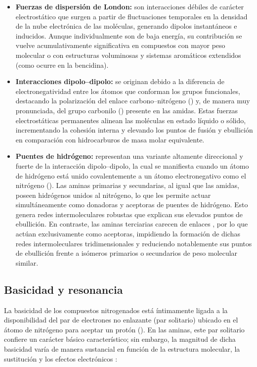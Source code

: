 \begin{itemize}
	\item \textbf{Fuerzas de dispersión de London:} son interacciones débiles de
	carácter electrostático que surgen a partir de fluctuaciones temporales en la
	densidad de la nube electrónica de las moléculas, generando dipolos
	instantáneos e inducidos. Aunque individualmente son de baja energía, su
	contribución se vuelve acumulativamente significativa en compuestos con mayor
	peso molecular o con estructuras voluminosas y sistemas aromáticos extendidos
	(como ocurre en la bencidina).
	\item \textbf{Interacciones dipolo--dipolo:} se originan debido a la diferencia
	de electronegatividad entre los átomos que conforman los grupos funcionales,
	destacando la polarización del enlace carbono--nitrógeno () y, de
	manera muy pronunciada, del grupo carbonilo () presente en las amidas.
	Estas fuerzas electrostáticas permanentes alinean las moléculas en estado
	líquido o sólido, incrementando la cohesión interna y elevando los puntos de
	fusión y ebullición en comparación con hidrocarburos de masa molar
	equivalente.
	\item \textbf{Puentes de hidrógeno:} representan una variante altamente
	direccional y fuerte de la interacción dipolo--dipolo, la cual se manifiesta
	cuando un átomo de hidrógeno está unido covalentemente a un átomo
	electronegativo como el nitrógeno (). Las aminas primarias y
	secundarias, al igual que las amidas, poseen hidrógenos unidos al nitrógeno,
	lo que les permite actuar simultáneamente como donadoras y aceptoras de
	puentes de hidrógeno. Esto genera redes intermoleculares robustas que explican
	sus elevados puntos de ebullición. En contraste, las aminas terciarias carecen
	de enlaces , por lo que actúan exclusivamente como aceptoras,
	impidiendo la formación de dichas redes intermoleculares tridimensionales y
	reduciendo notablemente sus puntos de ebullición frente a isómeros primarios o
	secundarios de peso molecular similar.
\end{itemize}

\subsection{Basicidad y resonancia}
La basicidad de los compuestos nitrogenados está íntimamente ligada a la
disponibilidad del par de electrones no enlazante (par solitario) ubicado en el
átomo de nitrógeno para aceptar un protón (). En las aminas, este par
solitario confiere un carácter básico característico; sin embargo, la magnitud de
dicha basicidad varía de manera sustancial en función de la estructura molecular,
la sustitución y los efectos electrónicos \cite{clayden2012}:


